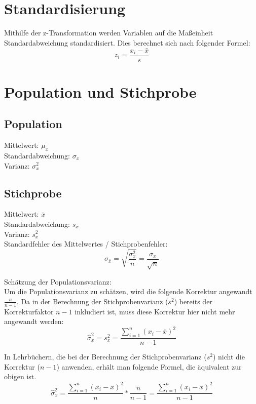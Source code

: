 \documentclass[11pt,a4paper]{article}
\begin{document}
\section{Standardisierung}
Mithilfe der z-Transformation werden Variablen auf die Maßeinheit Standardabweichung standardisiert. Dies berechnet sich nach folgender Formel: \\
$$z_i = \frac{x_i - \bar{x}}{s}$$


\section{Population und Stichprobe}
\subsection{Population}
Mittelwert: $\mu_x$\\

Standardabweichung: $\sigma_x$\\

Varianz: $\sigma^2_x$\\

\subsection{Stichprobe}
Mittelwert: $\bar{x}$ \\

Standardabweichung: $s_x$ \\

Varianz: $s^2_x$ \\

Standardfehler des Mittelwertes / Stichprobenfehler:\\
$$\sigma_{\bar{x}} = \sqrt{ \frac{\sigma^2_{x} } {n} } = \frac{ \sigma_{x}} { \sqrt{n}}$$

Schätzung der Populationsvarianz:\\
Um die Populationsvarianz zu schätzen, wird die folgende Korrektur angewandt $\frac{n}{n-1}$. Da in der Berechnung der Stichprobenvarianz ($s^2$) bereits der Korrekturfaktor $n-1$ inkludiert ist, muss diese Korrektur hier nicht mehr angewandt werden:\\
$$ \hat{\sigma}^2_x = s^2_x = \frac{ \sum\limits_{i=1}^n (x_{i} - \bar{x})^2} {n-1}$$

In Lehrbüchern, die bei der Berechnung der Stichprobenvarianz ($s^2$) nicht die Korrektur ($n-1$) anwenden, erhält man folgende Formel, die äquivalent zur obigen ist.
$$\hat{\sigma}^2_{x} = \frac{ \sum\limits_{i=1}^n (x_{i} - \bar{x})^2} {n} * \frac{n}{n-1}=  \frac{ \sum\limits_{i=1}^n (x_{i} - \bar{x})^2} {n-1}$$\\
\end{document}
